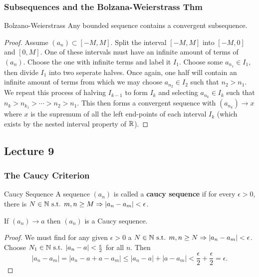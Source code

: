 \subsubsection{Subsequences and the Bolzana-Weierstrass Thm}
\begin{thm}{Bolzano-Weierstrass}{\label{thm:bw}}
    Any bounded sequence contains a convergent subsequence.
    \begin{proof}
        Assume $(a_n) \subset [-M, M]$. Split the interval $[-M, M]$ into $[-M, 0]$ and $[0, M]$. One of these intervals must have an infinite amount of terms of $(a_n)$. Choose the one with infinite terms and label it $I_1$. Choose some $a_{n_{1}} \in I_1$, then divide $I_1$ into two seperate halves. Once again, one half will contain an infinite amount of terms from which we may choose $a_{n_{2}} \in I_2$ such that $n_2 > n_1$. We repeat this process of halving $I_{k-1}$ to form $I_{k}$ and selecting $a_{n_{k}} \in I_k$ such that $n_k > n_{k_{1}} > \cdots > n_2 > n_1$. This then forms a convergent sequence with $(a_{n_{k}}) \to x$ where $x$ is the supremum of all the left end-points of each interval $I_k$ (which exists by the nested interval property of $\mathbb R$).
    \end{proof}
\end{thm}

\subsection{Lecture 9}
\subsubsection{The Caucy Criterion}
\begin{defbox}{Caucy Sequence}{}
    A sequence $(a_n)$ is called a \textbf{caucy sequence} if for every $\epsilon > 0$, there is $N \in \mathbb N \text{ s.t. } m, n \geq M \Rightarrow |a_n - a_m| < \epsilon$.  
\end{defbox}

\begin{lma}{}{\label{lma:1}}
    If $(a_n) \to a$ then $(a_n)$ is a Caucy sequence. 
    \begin{proof}
        We must find for any given $\epsilon > 0$ a $N \in \mathbb N \text{ s.t. } m, n \geq N \Rightarrow |a_n - a_m| < \epsilon$. Choose $N_1 \in \mathbb N \text{ s.t. } |a_n - a| < \frac{\epsilon}{2}$ for all $n$. Then 
        \[
            |a_n - a_m| = |a_n - a + a - a_m| \leq |a_n - a| + |a - a_m| < \frac{\epsilon}{2} + \frac{\epsilon}{2} = \epsilon.
        \]
    \end{proof}
\end{lma}

